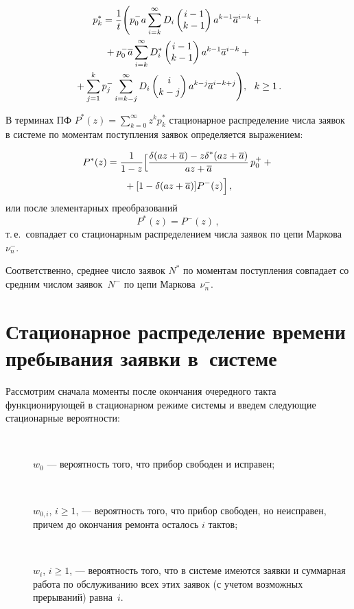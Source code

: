 \begin{multicols}{2}
\begin{enumerate}[(1)]
\noindent
\begin{multline*}
p_k^* = \displaystyle\frac{\displaystyle 1\mathstrut}{\displaystyle t\mathstrut} \Bigg(
p_{0}^- a \sum_{i=k}^{\infty} D_i \begin{pmatrix}i-1 \\ k-1\end{pmatrix} a^{k-1} \overline a^{i-k}
+{}\\
{}+ p_{0}^- \overline a \sum_{i=k}^{\infty} D^*_i \begin{pmatrix}i-1 \\ k-1\end{pmatrix} a^{k-1} \overline a^{i-k}
+{}\\
\hspace*{-5pt}{}+
\sum_{j=1}^{k} p_{j}^- \sum_{i=k-j}^{\infty} D_i \begin{pmatrix}i \\ k-j\end{pmatrix} a^{k-j} \overline a^{i-k+j}
\Bigg),
\ \ k\ge 1\,.\!\!\!
\end{multline*}
\end{enumerate}

В терминах ПФ $P^*(z)=\sum\limits_{k=0}^{\infty} z^k p_{k}^*$
стационарное распределение числа заявок в системе по
моментам поступления заявок определяется выражением:

\noindent
\begin{multline*}
P^*(z) = \displaystyle\frac{\displaystyle 1\mathstrut}{\displaystyle 1-z\mathstrut} \Big[
\displaystyle\frac{\displaystyle \delta(az+\overline a) - z \delta^*(az+\overline a) \mathstrut}{\displaystyle az+\overline a\mathstrut}\, p_{0}^+ +{}\\
{}+ [1 - \delta(az+\overline a)] P^-(z)
\Big]
\,,
\end{multline*}
или после элементарных преобразований
$$
P^*(z) = P^-(z) \,,
$$
т.\,е.\ совпадает со стационарным распределением числа заявок по цепи
Маркова $\nu^-_{n}$.

Соответственно, среднее число заявок $N^*$ по моментам
поступления совпадает со средним чис\-лом заявок~$N^-$
по цепи Маркова~$\nu^-_{n}$.

\section{Стационарное распределение времени пребывания заявки в~системе}

Рассмотрим сначала моменты после окончания очередного такта
функционирующей в стационарном режиме системы и введем
следующие стационарные вероятности:
\begin{description}
\item[\,]
$w_0$ --- вероятность того, что прибор свободен и
исправен;
\item[\,]
$w_{0,i}$, $i\ge1$, --- вероятность того, что прибор
свободен, но неисправен, причем до окончания ремонта
осталось $i$ тактов;
\item[\,]
$w_{i}$, $i\ge1$, --- вероятность того, что в системе
имеются заявки и суммарная работа по обслуживанию всех
этих заявок (с учетом возможных прерываний) равна~$i$.
\end{description}


\end{multicols}

